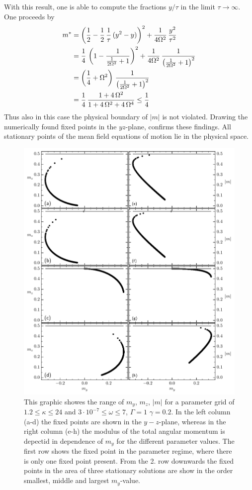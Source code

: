     With this result, one is able to compute the fractions $y/\tau$ in the limit $\tau\rightarrow\infty$. One proceeds by
    \begin{align*}
        m^*&=\left( \frac{1}{2}- \frac{1}{2}\,\frac{1}{\tau}\,(y^2-y) \right)^2+\frac{1}{4\Omega^2}\,\frac{y^2}{\tau^2}\\
        &=\frac{1}{4}\,\left( 1- \frac{1}{\frac{1}{2\Omega^2}+1}\right)^2+\frac{1}{4\Omega^2}\,\frac{1}{\left(\frac{1}{2\Omega^2}+1\right)^2}\\
        &=\left(\frac{1}{4}+\Omega^2\right)\,\frac{1}{\left(\frac{1}{2\Omega^2}+1\right)^2}\\
        &=\frac{1}{4}\,\frac{1+4\,\Omega^2}{1+4\,\Omega^2+4\,\Omega^4}\leq\frac{1}{4}
    \end{align*}
    Thus also in this case the physical boundary of $|m|$ is not violated. Drawing the numerically found fixed points in the $yz$-plane, confirms these findings. All stationary points of the mean field equations of motion lie in the physical space.
    \begin{figure}[H]
        \hspace*{-0.4cm}
        \includegraphics{pictures/fixp_boundaries.pdf}
        \caption{This graphic showes the range of $m_y$, $m_z$, $|m|$ for a parameter grid of $1.2\leq\kappa\leq24$ and $3\cdot10^{-7}\leq\omega\leq7$, $\Gamma=1$ $\gamma=0.2$. In the left column (a-d) the fixed points are shown in the $y-z$-plane, whereas in the right column (e-h) the modulus of the total angular momentum is depectid in dependence of $m_y$ for the different parameter values. The first row shows the fixed point in the parameter regime, where there is only one fixed point present. From the 2. row downwards the fixed points in the area of three stationary solutions are show in the order smallest, middle and largest $m_y$-value.}
    \end{figure}
    

